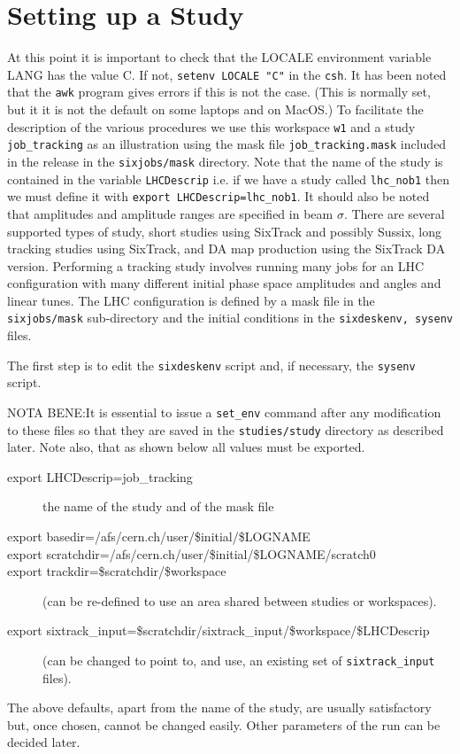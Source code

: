 \documentclass{article}    %
\begin{document}
\section{Setting up a Study}
\label{sec:study}
At this point it is important to check that the LOCALE environment variable
LANG has the value C. If not, {\tt setenv LOCALE "C"} in the {\tt csh}.
It has been noted that the {\tt awk} program gives errors if this is not the
case. (This is normally set, but it it is not the default on some laptops
and on MacOS.)
To facilitate the description of the various procedures we use this workspace
{\tt w1} and a study {\tt job\_tracking} as an illustration using the mask
file {\tt job\_tracking.mask} included in the release in the {\tt sixjobs/mask}
directory. Note that the name of the
study is contained in the variable {\tt LHCDescrip} i.e. if we have a study
called {\tt lhc\_nob1} then we must define it 
with {\tt export LHCDescrip=lhc\_nob1}. It should also be noted that amplitudes
and amplitude ranges are specified in beam $\sigma$.
There are several supported types of study, short studies using SixTrack and possibly
Sussix, long tracking studies using SixTrack, and DA map production using the SixTrack DA version.
Performing a tracking study involves running many jobs for an LHC configuration with
many different initial phase space amplitudes and angles and linear tunes. The LHC configuration is
defined by a mask file in the {\tt sixjobs/mask} sub-directory and the initial
conditions in the {\tt sixdeskenv, sysenv} files.

The first step is to edit the {\tt sixdeskenv} script and, if necessary, 
the {\tt sysenv} script.

NOTA BENE:It is essential to issue
a {\tt set\_env} command after any modification to these files so that 
they are saved in the {\tt studies/study} directory as described later.
Note also, that as shown below all values must be exported.

\begin{description}
\item [export LHCDescrip=job\_tracking] the name of the study and of the mask file
\item [export basedir=/afs/cern.ch/user/\$initial/\$LOGNAME]
\item [export scratchdir=/afs/cern.ch/user/\$initial/\$LOGNAME/scratch0]
\item [export trackdir=\$scratchdir/\$workspace]
(can be re-defined to use an area shared between studies or workspaces).
\item [export sixtrack\_input=\$scratchdir/sixtrack\_input/\$workspace/\$LHCDescrip]
(can be changed to point to, and use, an existing set of {\tt sixtrack\_input} files).
\end{description}
The above defaults, apart from the name of the study,
are usually satisfactory but, once chosen,
cannot be changed easily. Other parameters of the run can be decided later.
\end{document}
